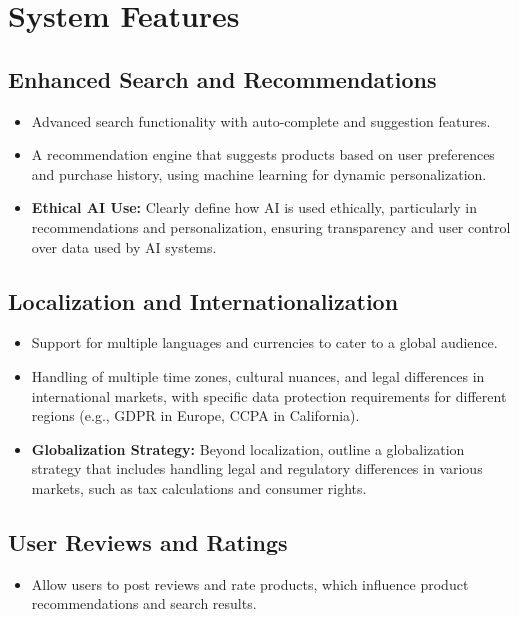 \documentclass[11pt]{article}
\begin{document}
	\section*{System Features}
	
	\subsection*{Enhanced Search and Recommendations}
	\begin{itemize}
		\item Advanced search functionality with auto-complete and suggestion features.
		\item A recommendation engine that suggests products based on user preferences and purchase history, using machine learning for dynamic personalization.
		\item \textbf{Ethical AI Use:} Clearly define how AI is used ethically, particularly in recommendations and personalization, ensuring transparency and user control over data used by AI systems.
	\end{itemize}
	
	\subsection*{Localization and Internationalization}
	\begin{itemize}
		\item Support for multiple languages and currencies to cater to a global audience.
		\item Handling of multiple time zones, cultural nuances, and legal differences in international markets, with specific data protection requirements for different regions (e.g., GDPR in Europe, CCPA in California).
		\item \textbf{Globalization Strategy:} Beyond localization, outline a globalization strategy that includes handling legal and regulatory differences in various markets, such as tax calculations and consumer rights.
	\end{itemize}
	
	\subsection*{User Reviews and Ratings}
	\begin{itemize}
		\item Allow users to post reviews and rate products, which influence product recommendations and search results.
	\end{itemize}
	
\end{document}
